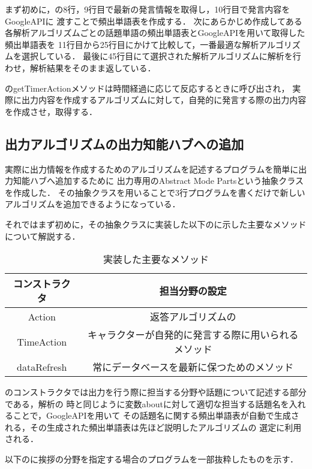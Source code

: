 まず初めに，の8行，9行目で最新の発言情報を取得し，10行目で発言内容をGoogleAPIに
渡すことで頻出単語表を作成する．
次にあらかじめ作成してある各解析アルゴリズムごとの話題単語の頻出単語表とGoogleAPIを用いて取得した頻出単語表を
11行目から25行目にかけて比較して，一番最適な解析アルゴリズムを選択している．
最後に45行目にて選択された解析アルゴリズムに解析を行わせ，解析結果をそのまま返している．

のgetTimerActionメソッドは時間経過に応じて反応するときに呼び出され，
実際に出力内容を作成するアルゴリズムに対して，自発的に発言する際の出力内容を作成させ，取得する．

\subsection{出力アルゴリズムの出力知能ハブへの追加}
実際に出力情報を作成するためのアルゴリズムを記述するプログラムを簡単に出力知能ハブへ追加するために
出力専用のAbstract Mode Partsという抽象クラスを作成した．
その抽象クラスを用いることで3行プログラムを書くだけで新しいアルゴリズムを追加できるようになっている．

それではまず初めに，その抽象クラスに実装した以下のに示した主要なメソッドについて解説する．

\begin{table}[tbh]
	\caption{実装した主要なメソッド} \label{tab:parts}
	\begin{center}
		\begin{tabular}[htb]{c|c}
		\hline
		コンストラクタ & 担当分野の設定 \\
		\hline
		Action & 返答アルゴリズムの \\
		\hline
		TimeAction & キャラクターが自発的に発言する際に用いられるメソッド \\
		\hline
		dataRefresh & 常にデータベースを最新に保つためのメソッド \\
		\hline
		\end{tabular}
	\end{center}
\end{table}

のコンストラクタでは出力を行う際に担当する分野や話題について記述する部分である，解析の
時と同じように変数aboutに対して適切な担当する話題名を入れることで，GoogleAPIを用いて
その話題名に関する頻出単語表が自動で生成される，その生成された頻出単語表は先ほど説明したアルゴリズムの
選定に利用される．

以下のに挨拶の分野を指定する場合のプログラムを一部抜粋したものを示す．

